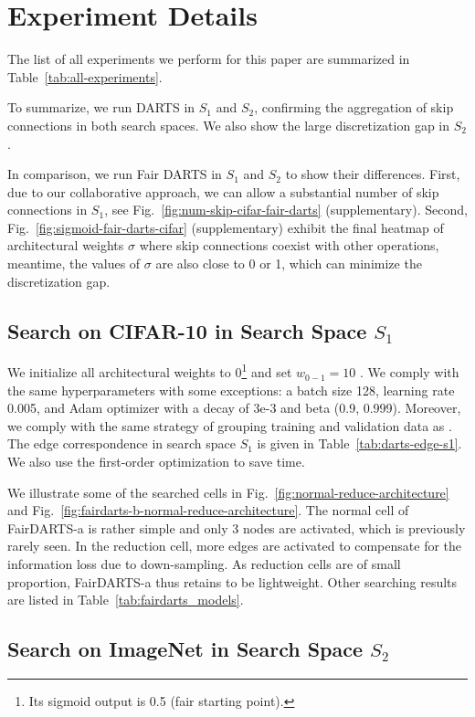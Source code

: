 \documentclass[runningheads]{llncs}
\begin{document}
\section{Experiment Details}

The list of all experiments we perform for this paper are summarized in Table~\ref{tab:all-experiments}. 

To summarize, we run DARTS \cite{liu2018darts} in $S_1$ and $S_2$, confirming the aggregation of skip connections in both search spaces. We also show the large discretization gap in $S_2$.

In comparison, we run Fair DARTS in $S_1$ and $S_2$ to show their differences. First, due to our collaborative approach, we can allow a substantial number of skip connections in $S_1$, see Fig.~\ref{fig:num-skip-cifar-fair-darts} (supplementary). Second, Fig.~\ref{fig:sigmoid-fair-darts-cifar} (supplementary) exhibit the final heatmap of architectural weights $\sigma$ where skip connections coexist with other operations, meantime, the values of $\sigma$  are also close to 0 or 1, which can minimize the discretization gap.

\subsection{Search on CIFAR-10 in Search Space $S_1$}
We initialize all architectural weights to 0\footnote{Its sigmoid output is 0.5 (fair starting point).} and set $w_{0-1}=10$ . We comply with the same hyperparameters with some exceptions: a batch size 128, learning rate 0.005, and Adam optimizer with a decay of 3e-3 and beta (0.9, 0.999).  Moreover, we comply with the same strategy of grouping training and validation data as \cite{liu2018darts}. The edge correspondence in search space $S_1$ is given in Table~\ref{tab:darts-edge-s1}. We also use the first-order optimization to save time. 

We illustrate some of the searched cells in Fig.~\ref{fig:normal-reduce-architecture} and Fig.~\ref{fig:fairdarts-b-normal-reduce-architecture}. The normal cell of FairDARTS-a is rather simple and only 3 nodes are activated, which is previously rarely seen. In the reduction cell, more edges are activated to compensate for the information loss due to down-sampling. As reduction cells are of small proportion, FairDARTS-a thus retains to be lightweight. Other searching results are listed in Table~\ref{tab:fairdarts_models}.

\subsection{Search on ImageNet in Search Space $S_2$}
\end{document}
